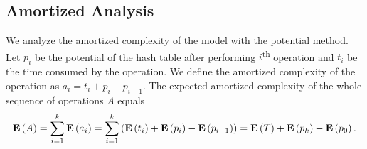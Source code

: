 \subsection{Amortized Analysis}
We analyze the amortized complexity of the model with the potential method. 
Let $p_i$ be the potential of the hash table after performing $i$\textsuperscript{th} operation and $t_i$ be the time consumed by the operation. 
We define the amortized complexity of the operation as $a_i = t_i + p_i - p_{i - 1}$. 
The expected amortized complexity of the whole sequence of operations $A$ equals
\[
\mathbf{E}\left(A\right) = \sum_{i=1}^{k} \mathbf{E}\left(a_i\right) = \sum_{i = 1}^{k} \left(\mathbf{E}\left(t_i\right) + \mathbf{E}\left(p_i\right) - \mathbf{E}\left(p_{i - 1}\right)\right) = \mathbf{E}\left(T\right) + \mathbf{E}\left(p_k\right) - \mathbf{E}\left(p_0\right).
\]


